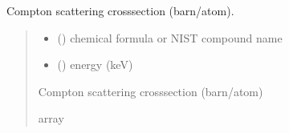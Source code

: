 \documentclass[letterpaper,10pt,english,openany,oneside]{sphinxmanual}
\begin{document}
\begin{fulllineitems}
\label{\detokenize{api/cross_sections:dxraylib.CSb_Compt_CP}}
\pysigstartsignatures
{}
\pysigstopsignatures
\sphinxAtStartPar
Compton scattering cross\sphinxhyphen{}section (barn/atom).
\begin{quote}\begin{description}
\begin{itemize}
\item {} 
\sphinxAtStartPar
{} () \textendash{} chemical formula or NIST compound name

\item {} 
\sphinxAtStartPar
{} () \textendash{} energy (keV)

\end{itemize}

\sphinxAtStartPar
Compton scattering cross\sphinxhyphen{}section (barn/atom)

\sphinxAtStartPar
array

\end{description}\end{quote}

\end{fulllineitems}


\begin{DUlineblock}{0em}
\item[] 
\end{DUlineblock}
\end{document}
